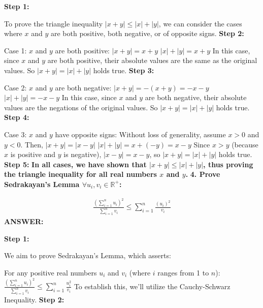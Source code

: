 \documentclass{article}
\begin{document}
\begin{flushleft}
\textbf{Step 1:}

To prove the triangle inequality $|x+y| \leq |x| + |y|$, we can consider the cases where $x$ and $y$ are both positive, both negative, or of opposite signs.
\newline\newline
\textbf{Step 2:}

Case 1: $x$ and $y$ are both positive:
$|x+y| = x+y$ 
$|x| + |y| = x + y$ 
In this case, since $x$ and $y$ are both positive, their absolute values are the same as the original values. So $|x+y| = |x| + |y|$ holds true.
\newline\newline
\textbf{Step 3:}

Case 2: $x$ and $y$ are both negative:
$|x+y| = -(x+y) = -x - y$ 
$|x| + |y| = -x - y$ 
In this case, since $x$ and $y$ are both negative, their absolute values are the negations of the original values. So $|x+y| = |x| + |y|$ holds true.
\newline\newline
\textbf{Step 4:}

Case 3: $x$ and $y$ have opposite signs:
Without loss of generality, assume $x > 0$ and $y < 0$. Then,
$|x+y| = |x-y|$ 
$|x| + |y| = x + (-y) = x - y$ 
Since $x > y$ (because $x$ is positive and $y$ is negative), $|x-y| = x-y$, so $|x+y| = |x| + |y|$ holds true.
\newline\newline
\textbf{Step 5:}
\newline\newline
\textbf{In all cases, we have shown that $|x+y| \leq |x| + |y|$, thus proving the triangle inequality for all real numbers $x$ and $y$.}
\newline\newline
\textbf{4. Prove Sedrakayan's Lemma $\forall u_i, v_i \in \mathbb{R}^+$:}

\begin{gather}
\frac{(\sum_{i=1}^n u_i)^2}{\sum_{i=1}^n v_i}
\leq
\sum_{i=1}^n \frac{(u_i)^2}{v_i}
\end{gather}
\newline\newline
\textbf{ANSWER:}

\textbf{Step 1:}

We aim to prove Sedrakayan's Lemma, which asserts:

For any positive real numbers $u_i$ and $v_i$ (where $i$ ranges from 1 to $n$):
\newline\newline
$\frac{(\sum_{i=1}^n u_i)^2}{\sum_{i=1}^n v_i} \leq \sum_{i=1}^n \frac{u_i^2}{v_i}$
\newline\newline
To establish this, we'll utilize the Cauchy-Schwarz Inequality.
\newline\newline
\textbf{Step 2:}


\end{flushleft}
\end{document}
